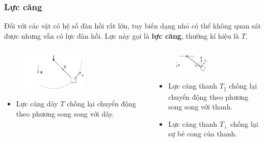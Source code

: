 \begin{frame}
    \frametitle{Lực căng}
    Đối với các vật có hệ số đàn hồi rất lớn, tuy biến dạng nhỏ có thể không quan sát được nhưng vẫn có lực đàn hồi. Lực này gọi là \textbf{lực căng}, thường kí hiệu là \(T\).
    \begin{columns}
    \begin{column}{0.5\textwidth}
        \begin{figure}
        \centering
        \includegraphics[width=0.6\textwidth]{Slides/Figure/rope.png}
        \end{figure}
        \begin{itemize}
            \item Lực căng dây \(T\) chống lại chuyển động theo phương song song với dây.
    \end{itemize}
    \end{column}
    \begin{column}{0.5\textwidth}
        \begin{figure}
        \centering
        \includegraphics[width=0.5\textwidth]{Slides/Figure/rod.png}
        \end{figure}
        \begin{itemize}
            \item Lực căng thanh \(T_{\parallel}\) chống lại chuyển động theo phương song song với thanh.
            \item Lực căng thanh \(T_{\perp}\) chống lại sự bẻ cong của thanh.
        \end{itemize}
    \end{column}
    \end{columns}
\end{frame}


